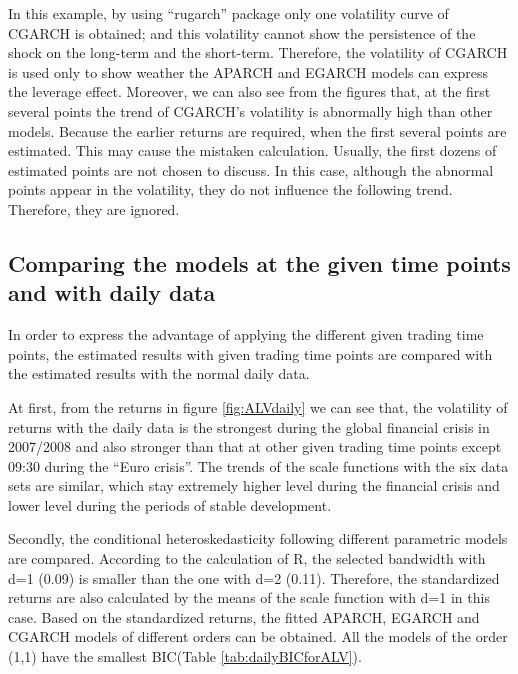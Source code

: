 In this example, by using ``rugarch'' package only one volatility curve of CGARCH is obtained; and this volatility cannot show the persistence of the shock on the long-term and the short-term. Therefore, the volatility of CGARCH is used only to show weather the APARCH and EGARCH models can express the leverage effect. Moreover, we can also see from the figures that, at the first several points the trend of CGARCH's volatility is abnormally high than other models. Because the earlier returns are required, when the first several points are estimated. This may cause the mistaken calculation. Usually, the first dozens of estimated points are not chosen to discuss. In this case, although the abnormal points appear in the volatility, they do not influence the following trend. Therefore, they are ignored.



\subsection{Comparing the models at the given time points and with daily data}

In order to express the advantage of applying the different given trading time points, the estimated results with given trading time points are compared with the estimated results with the normal daily data.

At first, from the returns in figure \ref{fig:ALVdaily} we can see that, the volatility of returns with the daily data is the strongest during the global financial crisis in 2007/2008 and also stronger than that at other given trading time points except 09:30 during the ``Euro crisis''. The trends of the scale functions with the six data sets are similar, which stay extremely higher level during the financial crisis and lower level during the periods of stable development.


Secondly, the conditional heteroskedasticity following different parametric models are compared. According to the calculation of R, the selected bandwidth with d=1 (0.09) is smaller than the one with d=2 (0.11). Therefore, the standardized returns are also calculated by the means of the scale function with d=1 in this case. Based on the standardized returns, the fitted APARCH, EGARCH and CGARCH models of different orders can be obtained. All the models of the order (1,1) have the smallest BIC(Table \ref{tab:dailyBICforALV}).




